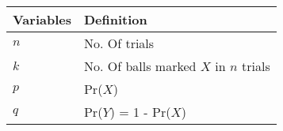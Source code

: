 	\begin{table}[]
		\begin{tabular}{|l|l|}\hline
			Variables	&Definition\\ \hline
			$n$	&No. Of trials\\
			$k$	&No. Of balls marked $X$ in $n$ trials\\
			$p$	&Pr($X$)\\
			$q$	&Pr($Y$) = 1 - Pr($X$)\\	\hline		
		\end{tabular}
	\end{table}

